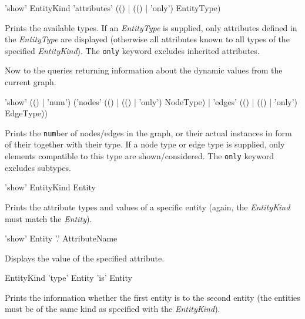 \begin{rail}
  'show' EntityKind 'attributes' (() | (() | 'only') EntityType)
\end{rail}
Prints the available  types.
If an \emph{EntityType} is supplied, only attributes defined in the \emph{EntityType} are displayed (otherwise all attributes known to all types of the specified \emph{EntityKind}).
The \texttt{only} keyword excludes inherited attributes.

Now to the queries returning information about the dynamic values from the current graph.

\begin{rail}
  'show' (() | 'num') ('nodes' (() | (() | 'only') NodeType) | 'edges' (() | (() | 'only') EdgeType))
\end{rail}
Prints the \texttt{num}ber of nodes/edges in the graph, or their actual instances in form of their  together with their type.
If a node type or edge type is supplied, only elements compatible to this type are shown/considered.
The \texttt{only} keyword excludes subtypes.

\begin{rail}
 'show' EntityKind Entity
\end{rail}
Prints the attribute types and values of a specific entity (again, the \emph{EntityKind} must match the \emph{Entity}).

\begin{rail}
  'show' Entity '.' AttributeName
\end{rail}
Displays the value of the specified attribute.

\begin{rail}
  EntityKind 'type' Entity 'is' Entity
\end{rail}
Prints the information whether the first entity is  to the second entity (the entities must be of the same kind as specified with the \emph{EntityKind}).


